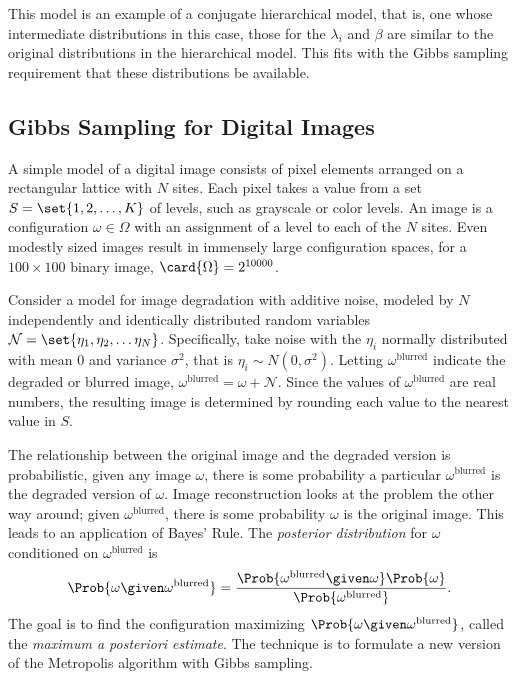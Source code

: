 \documentclass[12pt]{article}
\begin{document}
This model is an example of a conjugate hierarchical model,%
that is, one whose intermediate distributions in this case, those for
the \( \lambda_i \) and \( \beta \) are similar to the original
distributions in the hierarchical model.  This fits with the Gibbs
sampling requirement that these distributions be available.

\subsection*{Gibbs Sampling for Digital Images}

A simple model of a digital image consists of pixel elements arranged on
a rectangular lattice with \( N \) sites.  Each pixel takes a value from
a set \( S = \set{1,2, \dots, K} \) of levels, such as grayscale or
color levels.  An image is a configuration \( \omega \in \Omega \) with
an assignment of a level to each of the \( N \) sites.  Even modestly
sized images result in immensely large configuration spaces, for a \(
100 \times 100 \) binary image, \( \card{\Omega} = 2^{10000} \).

Consider a model for image degradation with additive noise, modeled by \(
N \) independently and identically distributed random variables \(
\mathcal{N} = \set{\eta_1, \eta_2, \dots \eta_N} \).  Specifically, take
noise with the \( \eta_i \) normally distributed with mean \( 0 \) and
variance \( \sigma^2 \), that is \( \eta_i \sim N(0, \sigma^2) \).
Letting \( \omega^{\text{blurred}} \) indicate the degraded or blurred
image, \( \omega^{\text{blurred}} = \omega + \mathcal{N} \).  Since the
values of \( \omega^{\text{blurred}} \) are real numbers, the resulting
image is determined by rounding each value to the nearest value in \( S \).

The relationship between the original image and the degraded version is
probabilistic, given any image \( \omega \), there is some probability a
particular \( \omega^{\text{blurred}} \) is the degraded version of \(
\omega \).  Image reconstruction looks at the problem the other way
around; given \( \omega^{\text{blurred}} \), there is some probability \(
\omega \) is the original image.  This leads to an application of Bayes'
Rule.  The \emph{posterior distribution}%
for \( \omega \) conditioned on \( \omega^{\text{blurred}} \) is
\[
    \Prob{\omega \given \omega^{\text{blurred}}} = \frac{\Prob{\omega^{\text
    {blurred}} \given \omega} \Prob{\omega}} {\Prob{\omega^{\text{blurred}}}}.
\] The goal is to find the configuration maximizing \( \Prob{\omega
\given \omega^{\text{blurred}}} \), called the \emph{maximum a
posteriori estimate}.%
The technique is to formulate a new version of the Metropolis algorithm
with Gibbs sampling.
\end{document}

